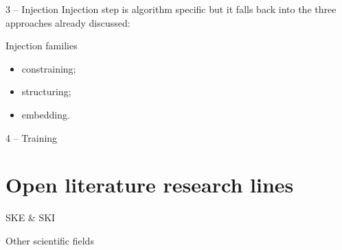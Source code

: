 \documentclass[presentation]{beamer}\mode<presentation>{\usetheme{AMSBolognaFC}}
\begin{document}
\begin{frame}[c]{3 -- Injection}
    Injection step is algorithm specific but it falls back into the three approaches already discussed:
    \begin{block}{Injection families}
        \begin{itemize}
            \item constraining;
            \item structuring;
            \item embedding.
        \end{itemize}
    \end{block}
\end{frame}

\begin{frame}[c]{4 -- Training}
\end{frame}

\section{Open literature research lines}


\begin{frame}[c]{SKE \& SKI}
\end{frame}


\begin{frame}[c]{Other scientific fields}
\end{frame}

\section*{}

\frame{\titlepage}

\section*{\refname}

\begin{frame}[c,noframenumbering]{\refname}
	\scriptsize
	
	
\end{frame}

\end{document}
